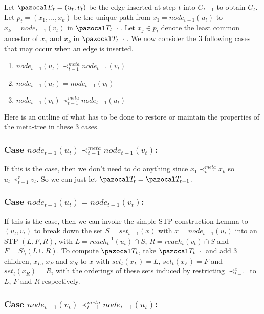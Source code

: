 \documentclass{report}
\begin{document}
Let $\pazocal E_t=(u_t,v_t)$ be the edge inserted at step $t$ into $G_{t-1}$ to obtain $G_t$. Let $p_t = (x_1,...,x_k)$ be the unique path from $x_1 = node_{t-1}(u_t)$ to $x_k = node_{t-1}(v_t)$ in $\pazocal T_{t-1}$. Let $x_j\in p_t$ denote the least common ancestor of $x_1$ and $x_k$ in $\pazocal T_{t-1}$. We now consider the 3 following cases that may occur when an edge is inserted.

\begin{enumerate}
\item $node_{t-1}(u_t) \prec_{t-1}^{meta} node_{t-1}(v_{t})$
\item $node_{t-1}(u_t) = node_{t-1}(v_t)$
\item $node_{t-1}(v_t) \prec_{t-1}^{meta} node_{t-1}(u_t)$ 
\end{enumerate}

Here is an outline of what has to be done to restore or maintain the properties of the meta-tree in these 3 cases.

\subsubsection{Case $node_{t-1}(u_t) \prec_{t-1}^{meta} node_{t-1}(v_{t})$:}

If this is the case, then we don't need to do anything since $x_{1} \prec_{t-1}^{meta} x_{k}$ so $u_t \prec_{t-1}^r v_t$. So we can just let $\pazocal T_t= \pazocal T_{t-1}$.

\subsubsection{Case $node_{t-1}(u_t) = node_{t-1}(v_t)$:}

If this is the case, then we can invoke the simple STP construction Lemma to $(u_t,v_t)$ to break down the set $S=set_{t-1}(x)$ with $x=node_{t-1}(u_t)$ into an STP $(L,F,R)$, with $L=reach_t^{-1}(u_t) \cap S$, $R=reach_t(v_t) \cap S$ and $F=S \setminus (L \cup R)$. To compute $\pazocal T_t$, take $\pazocal T_{t-1}$ and add 3 children, $x_{L}$, $x_{F}$ and $x_{R}$ to $x$ with $set_t(x_{L}) = L$, $set_t(x_{F}) = F$ and $set_t(x_{R}) = R$, with the orderings of these sets induced by restricting $\prec_{t-1}^{x}$ to $L$, $F$ and $R$ respectively.

\subsubsection{Case $node_{t-1}(v_t) \prec_{t-1}^{meta} node_{t-1}(u_t)$:}
\end{document}
